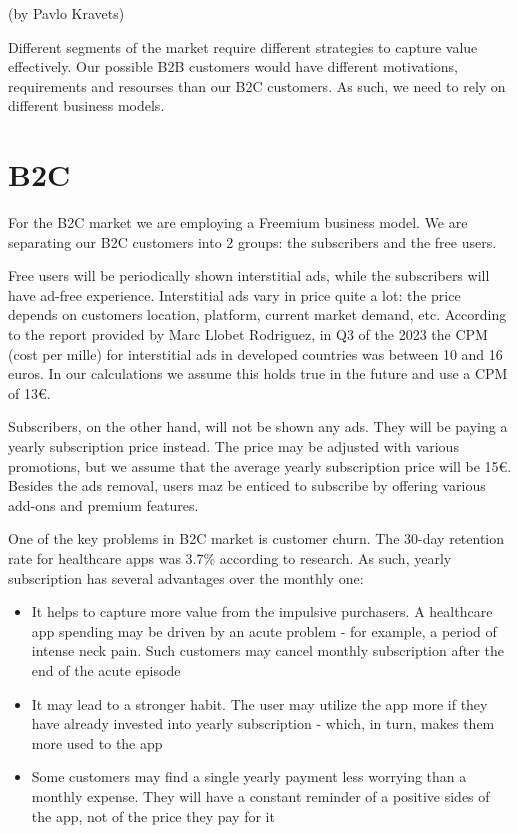 (by Pavlo Kravets)

\p
Different segments of the market require different strategies to capture value effectively. Our possible B2B customers would have different motivations, requirements and resourses than our B2C customers. As such, we need to rely on different business models.

\section{B2C}

For the B2C market we are employing a Freemium business model. We are separating our B2C customers into 2 groups: the subscribers and the free users.

\p
Free users will be periodically shown interstitial ads, while the subscribers will have ad-free experience. Interstitial ads vary in price quite a lot: the price depends on customers location, platform, current market demand, etc. According to the report provided by Marc Llobet Rodriguez\cite{ECPM}, in Q3 of the 2023 the CPM (cost per mille) for interstitial ads in developed countries was between 10 and 16 euros. In our calculations we assume this holds true in the future and use a CPM of 13€.

\p
Subscribers, on the other hand, will not be shown any ads. They will be paying a yearly subscription price instead. The price may be adjusted with various promotions, but we assume that the average yearly subscription price will be 15€. Besides the ads removal, users maz be enticed to subscribe by offering various add-ons and premium features.

\p
One of the key problems in B2C market is customer churn. The 30-day retention rate for healthcare apps was 3.7\% according to research\cite{churn}. As such, yearly subscription has several advantages over the monthly one:
\begin{itemize}
    \item It helps to capture more value from the impulsive purchasers. A healthcare app spending may be driven by an acute problem - for example, a period of intense neck pain. Such customers may cancel monthly subscription after the end of the acute episode
    \item It may lead to a stronger habit. The user may utilize the app more if they have already invested into yearly subscription - which, in turn, makes them more used to the app
    \item Some customers may find a single yearly payment less worrying than a monthly expense. They will have a constant reminder of a positive sides of the app, not of the price they pay for it
\end{itemize}

